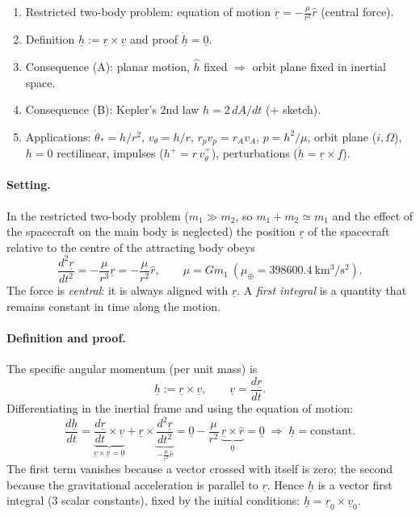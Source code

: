 \begin{outline}
\begin{enumerate}
\item Restricted two-body problem: equation of motion $\ddot{\underline r}=-\frac{\mu}{r^2}\hat r$ (central force).
\item Definition $\underline h:=\underline r\times\underline v$ and proof $\dot{\underline h}=\underline 0$.
\item Consequence (A): planar motion, $\hat h$ fixed $\Rightarrow$ orbit plane fixed in inertial space.
\item Consequence (B): Kepler's 2nd law $h=2\,dA/dt$ (+ sketch).
\item Applications: $\dot\theta_*=h/r^2$, $v_\theta=h/r$, $r_pv_p=r_Av_A$, $p=h^2/\mu$, orbit plane ($i,\Omega$), $h=0$ rectilinear,
impulses ($h^+=r\,v_\theta^+$), perturbations ($\dot{\underline h}=\underline r\times\underline f$).
\end{enumerate}
\end{outline}

\answer
\paragraph{Setting.} In the restricted two-body problem ($m_1\gg m_2$, so $m_1+m_2\simeq m_1$ and the effect of the
spacecraft on the main body is neglected) the position $\underline r$ of the spacecraft relative to the centre of the
attracting body obeys
\begin{equation}
\frac{d^{2}\underline{r}}{dt^{2}}=-\frac{\mu}{r^{3}}\underline{r}=-\frac{\mu}{r^{2}}\hat{r},
\qquad \mu=Gm_1 \ (\mu_\oplus=398600.4\ \mathrm{km^3/s^2}).
\end{equation}
The force is \emph{central}: it is always aligned with $\underline r$. A \emph{first integral} is a quantity that remains
constant in time along the motion.

\paragraph{Definition and proof.} The specific angular momentum (per unit mass) is
\begin{equation}
\underline{h}:=\underline{r}\times\underline{v},\qquad \underline{v}=\frac{d\underline{r}}{dt}.
\end{equation}
Differentiating in the inertial frame and using the equation of motion:
\begin{equation}
\frac{d\underline{h}}{dt}=\underbrace{\frac{d\underline{r}}{dt}\times\underline{v}}_{\underline v\times\underline v=\underline 0}
+\underline{r}\times\underbrace{\frac{d^{2}\underline{r}}{dt^{2}}}_{-\frac{\mu}{r^{2}}\hat{r}}
=\underline 0-\frac{\mu}{r^{2}}\,\underbrace{\underline r\times\hat r}_{\underline 0}=\underline 0
\;\Rightarrow\;\underline{h}=\text{constant}.
\end{equation}
The first term vanishes because a vector crossed with itself is zero; the second because the gravitational acceleration
is parallel to $\underline r$. Hence $\underline h$ is a vector first integral (3 scalar constants), fixed by the initial
conditions: $\underline h=\underline r_0\times\underline v_0$.

